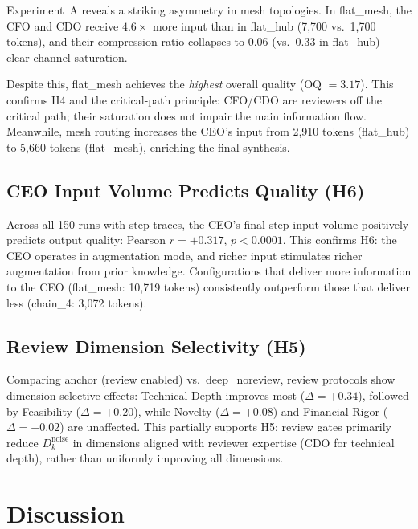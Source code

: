 \documentclass[conference]{IEEEtran}
\begin{document}
Experiment~A reveals a striking asymmetry in mesh topologies.
In flat\_mesh, the CFO and CDO receive $4.6\times$ more input than in flat\_hub (7,700 vs.\ 1,700 tokens), and their compression ratio collapses to 0.06 (vs.\ 0.33 in flat\_hub)---clear channel saturation.

Despite this, flat\_mesh achieves the \emph{highest} overall quality (OQ $= 3.17$).
This confirms H4 and the critical-path principle: CFO/CDO are reviewers off the critical path; their saturation does not impair the main information flow.
Meanwhile, mesh routing increases the CEO's input from 2,910 tokens (flat\_hub) to 5,660 tokens (flat\_mesh), enriching the final synthesis.

\subsection{CEO Input Volume Predicts Quality (H6)}
\label{subsec:h6_result}

Across all 150 runs with step traces, the CEO's final-step input volume positively predicts output quality: Pearson $r = +0.317$, $p < 0.0001$.
This confirms H6: the CEO operates in augmentation mode, and richer input stimulates richer augmentation from prior knowledge.
Configurations that deliver more information to the CEO (flat\_mesh: 10,719 tokens) consistently outperform those that deliver less (chain\_4: 3,072 tokens).

\subsection{Review Dimension Selectivity (H5)}
\label{subsec:h5_result}

Comparing anchor (review enabled) vs.\ deep\_noreview, review protocols show dimension-selective effects:
Technical Depth improves most ($\Delta = +0.34$), followed by Feasibility ($\Delta = +0.20$), while Novelty ($\Delta = +0.08$) and Financial Rigor ($\Delta = -0.02$) are unaffected.
This partially supports H5: review gates primarily reduce $D_k^{\text{noise}}$ in dimensions aligned with reviewer expertise (CDO for technical depth), rather than uniformly improving all dimensions.


\section{Discussion}
\label{sec:discussion}
\end{document}
